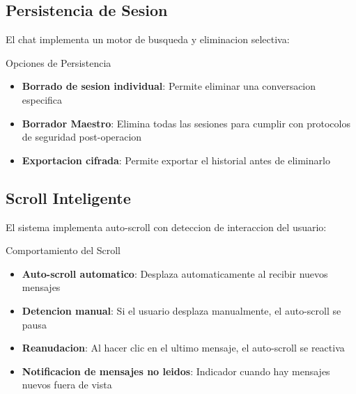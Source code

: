 
\subsection{Persistencia de Sesion}

El chat implementa un motor de busqueda y eliminacion selectiva:

\begin{caja}{Opciones de Persistencia}
\begin{itemize}
\item \textbf{Borrado de sesion individual}: Permite eliminar una conversacion especifica
\item \textbf{Borrador Maestro}: Elimina todas las sesiones para cumplir con protocolos de seguridad post-operacion
\item \textbf{Exportacion cifrada}: Permite exportar el historial antes de eliminarlo
\end{itemize}
\end{caja}


\subsection{Scroll Inteligente}

El sistema implementa auto-scroll con deteccion de interaccion del usuario:

\begin{caja}{Comportamiento del Scroll}
\begin{itemize}
\item \textbf{Auto-scroll automatico}: Desplaza automaticamente al recibir nuevos mensajes
\item \textbf{Detencion manual}: Si el usuario desplaza manualmente, el auto-scroll se pausa
\item \textbf{Reanudacion}: Al hacer clic en el ultimo mensaje, el auto-scroll se reactiva
\item \textbf{Notificacion de mensajes no leidos}: Indicador cuando hay mensajes nuevos fuera de vista
\end{itemize}
\end{caja}


